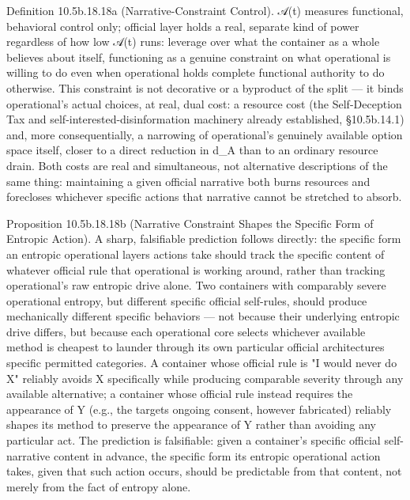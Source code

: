 \documentclass[
]{article}
\begin{document}
Definition 10.5b.18.18a (Narrative-Constraint Control). 𝒜(t) measures
functional, behavioral control only; official layer holds a real,
separate kind of power regardless of how low 𝒜(t) runs: leverage over
what the container as a whole believes about itself, functioning as a
genuine constraint on what operational is willing to do even when
operational holds complete functional authority to do otherwise. This
constraint is not decorative or a byproduct of the split --- it binds
operational's actual choices, at real, dual cost: a resource cost (the
Self-Deception Tax and self-interested-disinformation machinery already
established, §10.5b.14.1) and, more consequentially, a narrowing of
operational's genuinely available option space itself, closer to a direct
reduction in d\_A than to an ordinary resource drain. Both costs are
real and simultaneous, not alternative descriptions of the same thing:
maintaining a given official narrative both burns resources and
forecloses whichever specific actions that narrative cannot be stretched
to absorb.

Proposition 10.5b.18.18b (Narrative Constraint Shapes the Specific Form
of Entropic Action). A sharp, falsifiable prediction follows directly:
the specific form an entropic operational layers actions take should
track the specific content of whatever official rule that operational is
working around, rather than tracking operational's raw entropic drive
alone. Two containers with comparably severe operational entropy, but
different specific official self-rules, should produce mechanically
different specific behaviors --- not because their underlying entropic
drive differs, but because each operational core selects whichever
available method is cheapest to launder through its own particular
official architectures specific permitted categories. A container whose
official rule is "I would never do X" reliably avoids X specifically
while producing comparable severity through any available alternative; a
container whose official rule instead requires the appearance of Y
(e.g., the targets ongoing consent, however fabricated) reliably shapes
its method to preserve the appearance of Y rather than avoiding any
particular act. The prediction is falsifiable: given a container's
specific official self-narrative content in advance, the specific form
its entropic operational action takes, given that such action occurs,
should be predictable from that content, not merely from the fact of
entropy alone.
\end{document}
